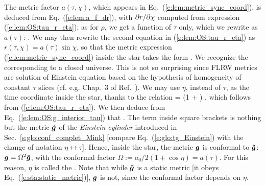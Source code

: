 The metric factor $a(\tau,\chi)$, which appears in Eq.~(\ref{e:lem:metric_sync_coord}),
is deduced from Eq.~(\ref{e:lem:a_f_dr}), with ${\partial r}/{\partial \chi}$ computed
from expression (\ref{e:lem:OS:tau_r_eta}); as for $\rho$, we get a function of $\tau$
only, which we rewrite as $a(\tau)$:
\be \label{e:lem:OS:a_tau}
   .
\ee
We may then rewrite the second equation in (\ref{e:lem:OS:tau_r_eta}) as
$r(\tau,\chi) = a(\tau) \sin\chi$, so that the metric
expression (\ref{e:lem:metric_sync_coord}) inside the star takes the form
\be \label{e:lem:OS:g_interior_tau}
   .
\ee
We recognize the  corresponding to a closed universe. This is not so surprising since FLRW metrics are solution of Einstein equation based on the hypothesis of homogeneity of constant $\tau$ slices (cf. e.g. Chap.~3 of Ref.~\cite{PeterU09}).
We may use $\eta$, instead of $\tau$, as the time coordinate inside the star, thanks to the
relation
\be
    \dd\tau =  (1 + \cos\eta) \dd\eta ,
\ee
which follows from (\ref{e:lem:OS:tau_r_eta}). We then deduce from Eq.~(\ref{e:lem:OS:g_interior_tau})
that
\be \label{e:lem:OS:g_int}
     .
\ee
The term inside square brackets is nothing but the metric $\tilde{\bm{g}}$ of the
\emph{Einstein cylinder} introduced in Sec.~\ref{s:glo:conf_complet_Mink}
[compare Eq.~(\ref{e:glo:tg_Einstein}) with the change of notation $\eta \leftrightarrow \tau$].
Hence, inside the star, the metric $\bm{g}$ is conformal to $\bm{\tilde{g}}$:
$\bm{g} = \Omega^2 \bm{\tilde{g}}$,
with the conformal factor $\Omega := a_0/2 (1 + \cos\eta) = a(\tau)$.
For this reason, $\eta$ is called the .
Note that while $\bm{\tilde{g}}$
is a static metric [it obeys Eq.~(\ref{e:sta:static_metric})], $\bm{g}$ is not, since
the conformal factor depends on $\eta$.


